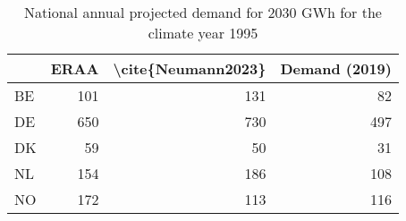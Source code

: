 \begin{table}
\centering
\caption{National annual projected demand for 2030  GWh for the climate year 1995}
\begin{tabular}{lrrr}
\toprule
{} &  ERAA &  \textbackslash cite\{Neumann2023\} &  Demand (2019) \\
\midrule
BE &   101 &                 131 &             82 \\
DE &   650 &                 730 &            497 \\
DK &    59 &                  50 &             31 \\
NL &   154 &                 186 &            108 \\
NO &   172 &                 113 &            116 \\
\bottomrule
\end{tabular}
\end{table}
